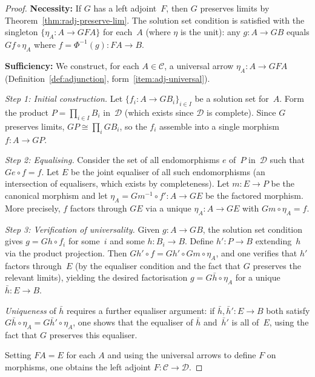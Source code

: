 \documentclass[a4paper,12pt]{book}
\theoremstyle{definition}
\theoremstyle{plain}
\theoremstyle{remark}
\begin{document}
\begin{proof}
\textbf{Necessity:}
If $G$ has a left adjoint~$F$, then $G$ preserves limits by
Theorem~\ref{thm:radj-preserve-lim}.
The solution set condition is satisfied with the singleton
$\{\eta_A\colon A\to GFA\}$ for each~$A$ (where $\eta$ is the unit):
any $g\colon A\to GB$ equals $Gf\circ\eta_A$ where
$f = \Phi^{-1}(g)\colon FA\to B$.

\medskip
\textbf{Sufficiency:}
We construct, for each $A\in\mathcal{C}$, a universal arrow
$\eta_A\colon A\to GFA$ (Definition~\ref{def:adjunction},
form~\ref{item:adj-universal}).

\medskip\noindent
\emph{Step 1: Initial construction.}
Let $\{f_i\colon A\to GB_i\}_{i\in I}$ be a solution set for~$A$.
Form the product $P = \prod_{i\in I} B_i$ in~$\mathcal{D}$
(which exists since $\mathcal{D}$ is complete).
Since $G$ preserves limits, $GP \cong \prod_i GB_i$,
so the $f_i$ assemble into a single morphism
$f\colon A\to GP$.

\medskip\noindent
\emph{Step 2: Equalising.}
Consider the set of all endomorphisms $e$ of~$P$ in~$\mathcal{D}$
such that $Ge\circ f = f$.  Let $E$ be the joint equaliser of all
such endomorphisms (an intersection of equalisers, which exists by
completeness).  Let $m\colon E\to P$ be the canonical morphism
and let $\eta_A = Gm^{-1}\circ f'\colon A\to GE$
be the factored morphism.  More precisely, $f$ factors through $GE$
via a unique $\eta_A\colon A\to GE$ with $Gm\circ\eta_A = f$.

\medskip\noindent
\emph{Step 3: Verification of universality.}
Given $g\colon A\to GB$, the solution set condition gives
$g = Gh\circ f_i$ for some~$i$ and some $h\colon B_i\to B$.
Define $h'\colon P\to B$ extending~$h$ via the product projection.
Then $Gh'\circ f = Gh'\circ Gm\circ\eta_A$,
and one verifies that $h'$ factors through~$E$
(by the equaliser condition and the fact that $G$ preserves the
relevant limits), yielding the desired factorisation
$g = G\bar h\circ\eta_A$ for a unique $\bar h\colon E\to B$.

\medskip\noindent
\emph{Uniqueness} of $\bar h$ requires a further equaliser argument:
if $\bar h,\bar h'\colon E\to B$ both satisfy $G\bar h\circ\eta_A
= G\bar h'\circ\eta_A$, one shows that the equaliser of $\bar h$
and~$\bar h'$ is all of~$E$, using the fact that $G$ preserves
this equaliser.

Setting $FA = E$ for each $A$ and using the universal arrows to define
$F$ on morphisms, one obtains the left adjoint
$F\colon\mathcal{C}\to\mathcal{D}$.
\end{proof}
\end{document}
